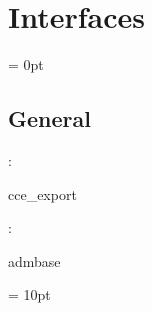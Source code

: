 
\section{Interfaces} 


\parskip = 0pt

\vspace{3mm} \subsection*{General}

: 

cce\_export
\vspace{2mm}

: 

admbase
\vspace{2mm}

\vspace{5mm}\parskip = 10pt 

